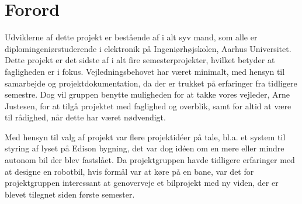 \chapter{Forord}
\label{ch:Forord}

Udviklerne af dette projekt er bestående af i alt syv mand, som alle er diplomingeniørstuderende i elektronik på Ingeniørhøjskolen, Aarhus Universitet. 
Dette projekt er det sidste af i alt fire semesterprojekter, hvilket betyder at fagligheden er i fokus. 
Vejledningsbehovet har været minimalt, med hensyn til samarbejde og projektdokumentation, da der er trukket på erfaringer fra tidligere semestre. 
Dog vil gruppen benytte muligheden for at takke vores vejleder, Arne Justesen, for at tilgå projektet med faglighed og overblik, samt for altid at være til rådighed, når dette har været nødvendigt.  

Med hensyn til valg af projekt var flere projektidéer på tale, bl.a. et system til styring af lyset på Edison bygning, det var dog idéen om en mere eller mindre autonom bil der blev fastslået. 
Da projektgruppen havde tidligere erfaringer med at designe en robotbil, hvis formål var at køre på en bane, var det for projektgruppen interessant at genoverveje et bilprojekt med ny viden, der er blevet tilegnet siden første semester. 
\clearpage